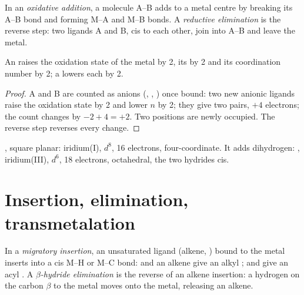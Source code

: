 \begin{definition}\label{def:b2:catalytic-cycles:oxidative-addition}
In an \emph{oxidative addition}, a molecule A--B adds to a
metal centre by breaking its A--B bond and forming M--A and M--B bonds. A
\emph{reductive elimination} is the reverse step: two
ligands A and B, cis to each other, join into A--B and leave the metal.
\end{definition}

\begin{proposition}\label{prop:b2:catalytic-cycles:oa}
An  raises the oxidation state of the metal by 2, its  by 2 and its coordination number by 2; a  lowers each by 2.
\end{proposition}

\begin{proof}
A and B are counted as anions (, , ) once bound: two new anionic
ligands raise the oxidation state by 2 and lower $n$ by 2; they give two pairs, $+4$
electrons; the count changes by $-2 + 4 = +2$. Two positions are newly occupied. The
reverse step reverses every change.
\end{proof}

\begin{example}\label{ex:b2:catalytic-cycles:vaska}
, square planar: iridium(I), $d^8$, 16 electrons, four-coordinate.
It adds dihydrogen: , iridium(III), $d^6$, 18 electrons, octahedral,
the two hydrides cis.
\end{example}

\section{Insertion, elimination, transmetalation}

\begin{definition}\label{def:b2:catalytic-cycles:insertion}
In a \emph{migratory insertion}, an unsaturated ligand
(alkene, ) bound to the metal inserts into a cis M--H or M--C bond:  and an
alkene give an alkyl ;  and  give an acyl .
A \emph{$\beta$-hydride elimination}
is the reverse of an alkene insertion: a hydrogen on the carbon $\beta$ to the
metal moves onto the metal, releasing an alkene.
\end{definition}


